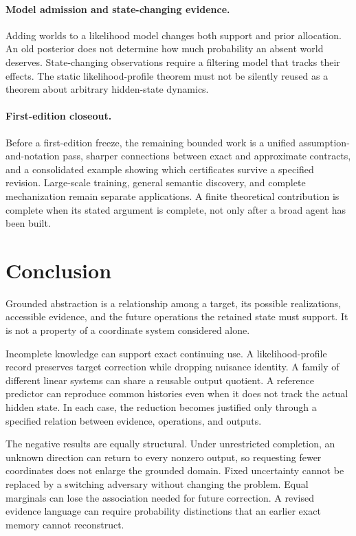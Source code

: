 \documentclass[11pt,letterpaper]{article}
\theoremstyle{plain}
\theoremstyle{definition}
\begin{document}
\paragraph{Model admission and state-changing evidence.}
Adding worlds to a likelihood model changes both support and prior allocation. An old posterior does not determine how much probability an absent world deserves. State-changing observations require a filtering model that tracks their effects. The static likelihood-profile theorem must not be silently reused as a theorem about arbitrary hidden-state dynamics.

\paragraph{First-edition closeout.}
Before a first-edition freeze, the remaining bounded work is a unified assumption-and-notation pass, sharper connections between exact and approximate contracts, and a consolidated example showing which certificates survive a specified revision. Large-scale training, general semantic discovery, and complete mechanization remain separate applications. A finite theoretical contribution is complete when its stated argument is complete, not only after a broad agent has been built.

\section{Conclusion}\label{sec:conclusion}
Grounded abstraction is a relationship among a target, its possible realizations, accessible evidence, and the future operations the retained state must support. It is not a property of a coordinate system considered alone.

Incomplete knowledge can support exact continuing use. A likelihood-profile record preserves target correction while dropping nuisance identity. A family of different linear systems can share a reusable output quotient. A reference predictor can reproduce common histories even when it does not track the actual hidden state. In each case, the reduction becomes justified only through a specified relation between evidence, operations, and outputs.

The negative results are equally structural. Under unrestricted completion, an unknown direction can return to every nonzero output, so requesting fewer coordinates does not enlarge the grounded domain. Fixed uncertainty cannot be replaced by a switching adversary without changing the problem. Equal marginals can lose the association needed for future correction. A revised evidence language can require probability distinctions that an earlier exact memory cannot reconstruct.
\end{document}
